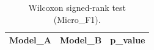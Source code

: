 \begin{table}[t]
\centering
\begin{tabular}{lll}
\toprule
Model_A & Model_B & p_value \\
\midrule
\bottomrule
\end{tabular}
\caption{Wilcoxon signed-rank test (Micro_F1).}
\label{tab:wilcoxon_Micro_F1}
\end{table}